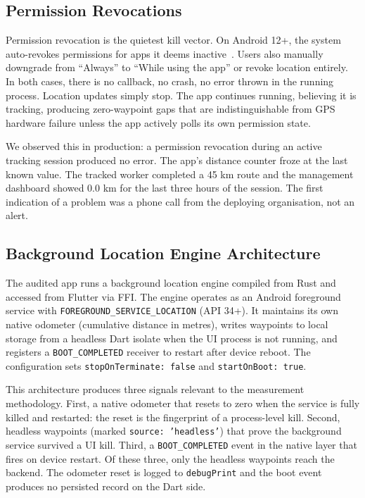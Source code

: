 \documentclass[10pt,journal,compsoc]{IEEEtran}
\begin{document}
\subsection{Permission Revocations}

Permission revocation is the quietest kill vector. On Android 12+, the
system auto-revokes permissions for apps it deems
inactive~\cite{android_hibernate}. Users also manually downgrade from
``Always'' to ``While using the app'' or revoke location entirely. In
both cases, there is no callback, no crash, no error thrown in the
running process. Location updates simply stop. The app continues running,
believing it is tracking, producing zero-waypoint gaps that are
indistinguishable from GPS hardware failure unless the app actively polls
its own permission state.

We observed this in production: a permission revocation during an active
tracking session produced no error. The app's distance counter froze at
the last known value. The tracked worker completed a 45 km route and
the management dashboard showed 0.0 km for the last three hours of the
session. The first indication of a problem was a phone call from the
deploying organisation, not an alert.

\subsection{Background Location Engine Architecture}
\label{sec:engine}

The audited app runs a background location engine compiled from Rust and
accessed from Flutter via FFI. The engine operates as an Android
foreground service with \texttt{FOREGROUND\_SERVICE\_LOCATION} (API 34+).
It maintains its own native odometer (cumulative distance in metres),
writes waypoints to local storage from a headless Dart isolate when the
UI process is not running, and registers a \texttt{BOOT\_COMPLETED}
receiver to restart after device reboot. The configuration sets
\texttt{stopOnTerminate: false} and \texttt{startOnBoot: true}.

This architecture produces three signals relevant to the measurement
methodology. First, a native odometer that resets to zero when the
service is fully killed and restarted: the reset is the fingerprint of a
process-level kill. Second, headless waypoints (marked
\texttt{source: 'headless'}) that prove the background service survived a
UI kill. Third, a \texttt{BOOT\_COMPLETED} event in the native layer
that fires on device restart. Of these three, only the headless waypoints
reach the backend. The odometer reset is logged to \texttt{debugPrint}
and the boot event produces no persisted record on the Dart side.
\end{document}
